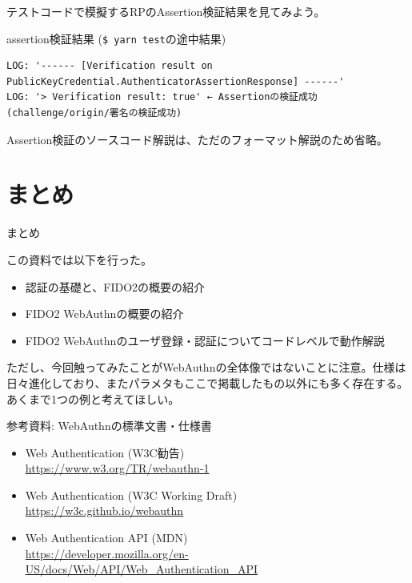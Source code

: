 \documentclass[12pt,dvipdfmx,uplatex]{beamer}
\begin{document}
\begin{frame}[fragile]
テストコードで模擬するRPのAssertion検証結果を見てみよう。
\begin{exampleblock}{\scriptsize assertion検証結果 (\texttt{\$ yarn test}の途中結果)}
\tiny
\begin{verbatim}
LOG: '------ [Verification result on PublicKeyCredential.AuthenticatorAssertionResponse] ------'
LOG: '> Verification result: true' ← Assertionの検証成功 (challenge/origin/署名の検証成功)
\end{verbatim}
\end{exampleblock}
Assertion検証のソースコード解説は、ただのフォーマット解説のため省略。
\end{frame}

\section{まとめ}
\begin{frame}
\centering
{\huge まとめ}
\end{frame}

\begin{frame}
この資料では以下を行った。
\begin{itemize}
 \item 認証の基礎と、FIDO2の概要の紹介
 \item FIDO2 WebAuthnの概要の紹介
 \item FIDO2 WebAuthnのユーザ登録・認証についてコードレベルで動作解説
\end{itemize}

ただし、今回触ってみたことがWebAuthnの全体像ではないことに注意。仕様は日々進化しており、またパラメタもここで掲載したもの以外にも多く存在する。あくまで1つの例と考えてほしい。
\end{frame}


\begin{frame}{参考資料: WebAuthnの標準文書・仕様書}
\small
\begin{itemize}
 \item Web Authentication (W3C勧告)\\ \url{https://www.w3.org/TR/webauthn-1}
 \item Web Authentication (W3C Working Draft)\\ \url{https://w3c.github.io/webauthn}
 \item Web Authentication API (MDN)\\ \url{https://developer.mozilla.org/en-US/docs/Web/API/Web_Authentication_API}
\end{itemize}
\end{frame}




 

\end{document}
